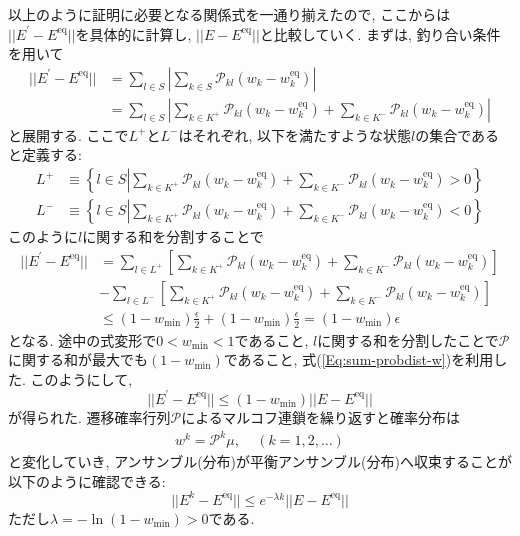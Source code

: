 以上のように証明に必要となる関係式を一通り揃えたので, ここからは$|| E^{\prime} - E^{\mathrm{eq}}||$を具体的に計算し, $|| E- E^{\mathrm{eq}}||$と比較していく.
まずは, 釣り合い条件を用いて
\begin{align}
    || E^{\prime} - E^{\mathrm{eq}}||
    &=
    \sum_{l \in S}
    \left| \sum_{k \in S} \mathcal{P}_{kl} (w_{k} - w_{k}^{\mathrm{eq}}) \right| \\
    &=
    \sum_{l \in S}
    \left|
          \sum_{k \in K^{+}} \mathcal{P}_{kl} (w_{k} - w_{k}^{\mathrm{eq}})
        + \sum_{k \in K^{-}} \mathcal{P}_{kl} (w_{k} - w_{k}^{\mathrm{eq}})
    \right|
\end{align}
と展開する.
ここで$L^{+}$と$L^{-}$はそれぞれ, 以下を満たすような状態$l$の集合であると定義する:
\begin{align}
    L^{+}
    &\equiv
    \left\{
        l \in S
        \left|
        \sum_{k \in K^{+}} \mathcal{P}_{kl} (w_{k} - w_{k}^{\mathrm{eq}})
      + \sum_{k \in K^{-}} \mathcal{P}_{kl} (w_{k} - w_{k}^{\mathrm{eq}}) > 0
    \right\} \right.
    \\
    L^{-}
    &\equiv
    \left\{
        l \in S
        \left|
        \sum_{k \in K^{+}} \mathcal{P}_{kl} (w_{k} - w_{k}^{\mathrm{eq}})
      + \sum_{k \in K^{-}} \mathcal{P}_{kl} (w_{k} - w_{k}^{\mathrm{eq}}) < 0
    \right\} \right.
\end{align}
このように$l$に関する和を分割することで
\begin{align}
    || E^{\prime} - E^{\mathrm{eq}}||
    &=
    \sum_{l \in L^{+}}
    \left[
          \sum_{k \in K^{+}} \mathcal{P}_{kl} (w_{k} - w_{k}^{\mathrm{eq}})
        + \sum_{k \in K^{-}} \mathcal{P}_{kl} (w_{k} - w_{k}^{\mathrm{eq}})
    \right]
    \\
    &-
    \sum_{l \in L^{-}}
    \left[
          \sum_{k \in K^{+}} \mathcal{P}_{kl} (w_{k} - w_{k}^{\mathrm{eq}})
        + \sum_{k \in K^{-}} \mathcal{P}_{kl} (w_{k} - w_{k}^{\mathrm{eq}})
    \right]
    \\
    &\le
    (1 - w_{\min}) \frac{\epsilon}{2} + (1 - w_{\min}) \frac{\epsilon}{2}
    =
    (1 - w_{\min})\epsilon
\end{align}
となる. 途中の式変形で$0 < w_{\min} < 1$であること, $l$に関する和を分割したことで$\mathcal{P}$に関する和が最大でも$(1 - w_{\min})$であること, 式(\ref{Eq:sum-probdist-w})を利用した.
このようにして,
\begin{equation}
    || E^{\prime} - E^{\mathrm{eq}} ||
    \le
    (1 - w_{\min}) || E - E^{\mathrm{eq}} ||
\end{equation}
が得られた.
遷移確率行列$\mathcal{P}$によるマルコフ連鎖を繰り返すと確率分布は
\begin{eqnarray}
    w^{k} = \mathcal{P}^{k} \mu,~~~~~(k=1,2,\ldots)
\end{eqnarray}
と変化していき, アンサンブル(分布)が平衡アンサンブル(分布)へ収束することが以下のように確認できる:
\begin{equation}
    || E^{k} - E^{\mathrm{eq}} ||
    \le
    e^{-\lambda k} || E - E^{\mathrm{eq}} ||
\end{equation}
ただし$\lambda = - \ln(1-w_{\min}) > 0$である.


